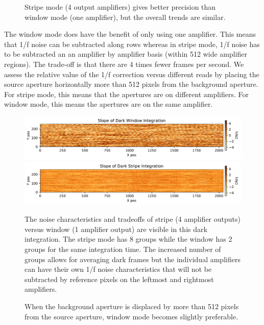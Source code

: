 \documentclass{aastex62}
\begin{document}
{\begin{figure}
{}
\caption{Stripe mode (4 output amplifiers) gives better precision than window mode (one amplifier), but the overall trends are similar.
}\label{fig:stripeVsWindowAZlab04}
\end{figure}

The window mode does have the benefit of only using one amplifier.
This means that 1/f noise can be subtracted along rows whereas in stripe mode, 1/f noise has to be subtracted an an amplifier by amplifier basis (within 512 wide amplifier regions).
The trade-off is that there are 4 times fewer frames per second.
We assess the relative value of the 1/f correction versus different reads by placing the source aperture horizontally more than 512 pixels from the background aperture.
For stripe mode, this means that the apertures are on different amplifiers.
For window mode, this means the apertures are on the same amplifier.

\begin{figure}[!hbtp]
\centering
\includegraphics[width=0.7\columnwidth]{darkwindow_img.pdf}
\includegraphics[width=.7\columnwidth]{darkstripe_img.pdf}
\caption{The noise characteristics and tradeoffs of stripe (4 amplifier outputs) versus window (1 amplifier output) are visible in this dark integration.
The stripe mode has 8 groups while the window has 2 groups for the same integration time.
The increased number of groups allows for averaging dark frames but the individual amplifiers can have their own 1/f noise characteristics that will not be subtracted by reference pixels on the leftmost and rightmost amplifiers.}\label{fig:darkWindowVsDarkStripe}
\end{figure}


\begin{figure}
{}
\caption{When the background aperture is displaced by more than 512 pixels from the source aperture, window mode becomes slightly preferable.
}\label{fig:stripeVsWindowAZlab04LargerBacksep}
\end{figure}


}
\end{document}
